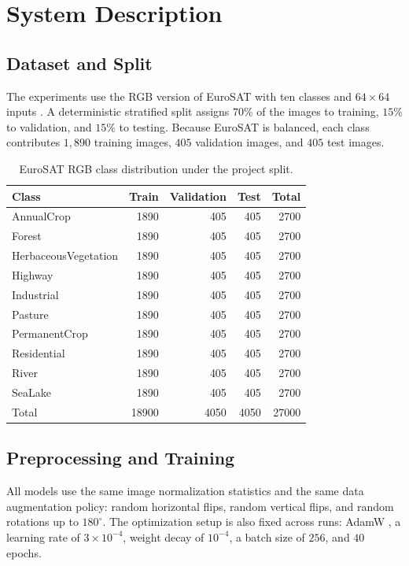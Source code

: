 \documentclass[11pt]{report}
\begin{document}
\chapter{System Description}
\section{Dataset and Split}
The experiments use the RGB version of EuroSAT with ten classes and \(64 \times 64\) inputs \cite{helber2019}. A deterministic stratified split assigns \(70\%\) of the images to training, \(15\%\) to validation, and \(15\%\) to testing. Because EuroSAT is balanced, each class contributes \(1{,}890\) training images, \(405\) validation images, and \(405\) test images.

\begin{table}[h]
    \centering
    \caption{EuroSAT RGB class distribution under the project split.}
    \begin{tabular}{lrrrr}
        \toprule
        Class & Train & Validation & Test & Total \\
        \midrule
        AnnualCrop & 1890 & 405 & 405 & 2700 \\
        Forest & 1890 & 405 & 405 & 2700 \\
        HerbaceousVegetation & 1890 & 405 & 405 & 2700 \\
        Highway & 1890 & 405 & 405 & 2700 \\
        Industrial & 1890 & 405 & 405 & 2700 \\
        Pasture & 1890 & 405 & 405 & 2700 \\
        PermanentCrop & 1890 & 405 & 405 & 2700 \\
        Residential & 1890 & 405 & 405 & 2700 \\
        River & 1890 & 405 & 405 & 2700 \\
        SeaLake & 1890 & 405 & 405 & 2700 \\
        \midrule
        Total & 18900 & 4050 & 4050 & 27000 \\
        \bottomrule
    \end{tabular}
\end{table}

\section{Preprocessing and Training}
All models use the same image normalization statistics and the same data augmentation policy: random horizontal flips, random vertical flips, and random rotations up to \(180^\circ\). The optimization setup is also fixed across runs: AdamW \cite{loshchilov2019}, a learning rate of \(3 \times 10^{-4}\), weight decay of \(10^{-4}\), a batch size of \(256\), and \(40\) epochs.
\end{document}
